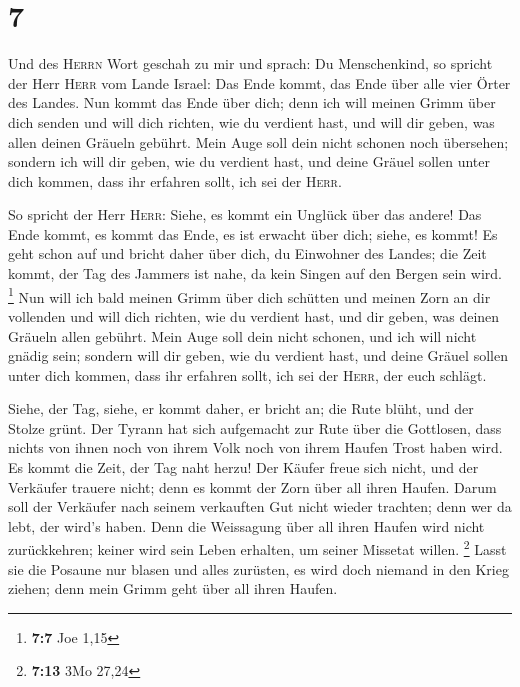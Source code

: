 \hypertarget{section-3}{%
\section{7}\label{section-3}}

 Und des \textsc{Herrn} Wort geschah zu mir und sprach:
 Du Menschenkind, so spricht der Herr \textsc{Herr} vom
Lande Israel: Das Ende kommt, das Ende über alle vier Örter des Landes.
 Nun kommt das Ende über dich; denn ich will meinen Grimm
über dich senden und will dich richten, wie du verdient hast, und will
dir geben, was allen deinen Gräueln gebührt.  Mein Auge
soll dein nicht schonen noch übersehen; sondern ich will dir geben, wie
du verdient hast, und deine Gräuel sollen unter dich kommen, dass ihr
erfahren sollt, ich sei der \textsc{Herr}.

 So spricht der Herr \textsc{Herr}: Siehe, es kommt ein
Unglück über das andere!  Das Ende kommt, es kommt das
Ende, es ist erwacht über dich; siehe, es kommt!  Es geht
schon auf und bricht daher über dich, du Einwohner des Landes; die Zeit
kommt, der Tag des Jammers ist nahe, da kein Singen auf den Bergen sein
wird. \footnote{\textbf{7:7} Joe 1,15}  Nun will ich bald
meinen Grimm über dich schütten und meinen Zorn an dir vollenden und
will dich richten, wie du verdient hast, und dir geben, was deinen
Gräueln allen gebührt.  Mein Auge soll dein nicht schonen,
und ich will nicht gnädig sein; sondern will dir geben, wie du verdient
hast, und deine Gräuel sollen unter dich kommen, dass ihr erfahren
sollt, ich sei der \textsc{Herr}, der euch schlägt.

 Siehe, der Tag, siehe, er kommt daher, er bricht an; die
Rute blüht, und der Stolze grünt.  Der Tyrann hat sich
aufgemacht zur Rute über die Gottlosen, dass nichts von ihnen noch von
ihrem Volk noch von ihrem Haufen Trost haben wird.  Es
kommt die Zeit, der Tag naht herzu! Der Käufer freue sich nicht, und der
Verkäufer trauere nicht; denn es kommt der Zorn über all ihren Haufen.
 Darum soll der Verkäufer nach seinem verkauften Gut
nicht wieder trachten; denn wer da lebt, der wird's haben. Denn die
Weissagung über all ihren Haufen wird nicht zurückkehren; keiner wird
sein Leben erhalten, um seiner Missetat willen. \footnote{\textbf{7:13}
  3Mo 27,24}  Lasst sie die Posaune nur blasen und alles
zurüsten, es wird doch niemand in den Krieg ziehen; denn mein Grimm geht
über all ihren Haufen.

